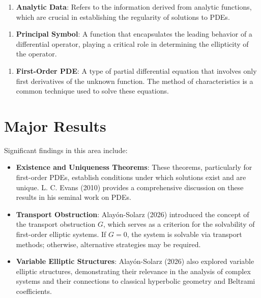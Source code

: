 \documentclass[11pt,a4paper]{article}
\begin{document}
\begin{enumerate}
\item \textbf{Analytic Data}: Refers to the information derived from analytic functions, which are crucial in establishing the regularity of solutions to PDEs.
\end{enumerate}

\begin{enumerate}
\item \textbf{Principal Symbol}: A function that encapsulates the leading behavior of a differential operator, playing a critical role in determining the ellipticity of the operator.
\end{enumerate}

\begin{enumerate}
\item \textbf{First-Order PDE}: A type of partial differential equation that involves only first derivatives of the unknown function. The method of characteristics is a common technique used to solve these equations.
\end{enumerate}

\section{Major Results}
Significant findings in this area include:

\begin{itemize}
\item \textbf{Existence and Uniqueness Theorems}: These theorems, particularly for first-order PDEs, establish conditions under which solutions exist and are unique. L. C. Evans (2010) provides a comprehensive discussion on these results in his seminal work on PDEs.
\end{itemize}

\begin{itemize}
\item \textbf{Transport Obstruction}: Alayón-Solarz (2026) introduced the concept of the transport obstruction \( G \), which serves as a criterion for the solvability of first-order elliptic systems. If \( G = 0 \), the system is solvable via transport methods; otherwise, alternative strategies may be required.
\end{itemize}

\begin{itemize}
\item \textbf{Variable Elliptic Structures}: Alayón-Solarz (2026) also explored variable elliptic structures, demonstrating their relevance in the analysis of complex systems and their connections to classical hyperbolic geometry and Beltrami coefficients.
\end{itemize}
\end{document}
